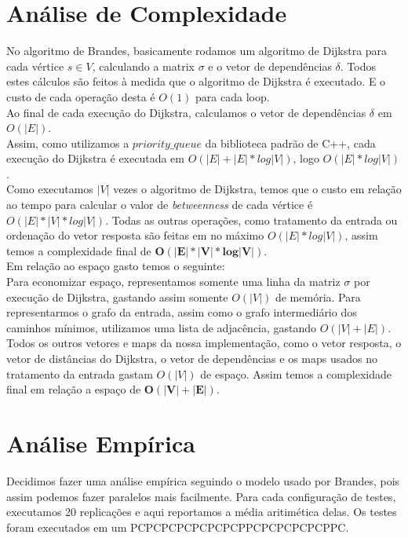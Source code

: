\documentclass[10pt]{article}
\begin{document}
\section{Análise de Complexidade}
No algoritmo de Brandes, basicamente rodamos um algoritmo de Dijkstra para cada vértice $s \in V$, calculando a matrix $\sigma$ e o vetor de dependências $\delta$. Todos estes cálculos são feitos à medida que o algoritmo de Dijkstra é executado. E o custo de cada operação desta é $O(1)$ para cada loop.\\
Ao final de cada execução do Dijkstra, calculamos o vetor de dependências $\delta$ em $O(|E|)$.\\
Assim, como utilizamos a $priority\_queue$ da biblioteca padrão de C++, cada execução do Dijkstra é executada em $O(|E| + |E| * log |V|)$, logo $O(|E| * log |V|)$.\\
Como executamos $|V|$ vezes o algoritmo de Dijkstra, temos que o custo em relação ao tempo para calcular o valor de \textit{betweenness} de cada vértice é $O(|E| * |V| * log |V|)$. Todas as outras operações, como tratamento da entrada ou ordenação do vetor resposta são feitas em no máximo $O(|E| * log |V|)$, assim temos a complexidade final de $\bm{O(|E| * |V| * log |V|)}$.\\

Em relação ao espaço gasto temos o seguinte:\\
Para economizar espaço, representamos somente uma linha da matriz $\sigma$ por execução de Dijkstra, gastando assim somente $O(|V|)$ de memória. Para representarmos o grafo da entrada, assim como o grafo intermediário dos caminhos mínimos, utilizamos uma lista de adjacência, gastando $O(|V| + |E|)$. Todos os outros vetores e maps da nossa implementação, como o vetor resposta, o vetor de distâncias do Dijkstra, o vetor de dependências e os maps usados no tratamento da entrada gastam $O(|V|)$ de espaço. Assim temos a complexidade final em relação a espaço de $\bm{O(|V| + |E|)}$.


\section{Análise Empírica}
Decidimos fazer uma análise empírica seguindo o modelo usado por Brandes, pois assim podemos fazer paralelos mais facilmente.
Para cada configuração de testes, executamos 20 replicações e aqui reportamos a média aritimética delas.
Os testes foram executados em um PCPCPCPCPCPCPCPPCPCPCPCPCPPC.
\end{document}
